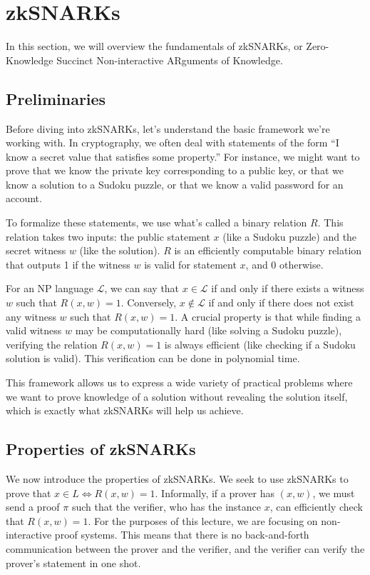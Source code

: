 \newcommand{\out}{\mathsf{out}}
\newcommand{\Assign}{:=}

\section{zkSNARKs}

In this section, we will overview the fundamentals of zkSNARKs, or Zero-Knowledge Succinct Non-interactive ARguments of Knowledge.

\subsection{Preliminaries}

Before diving into zkSNARKs, let's understand the basic framework we're working with. In cryptography, we often deal with statements of the form ``I know a secret value that satisfies some property.'' For instance, we might want to prove that we know the private key corresponding to a public key, or that we know a solution to a Sudoku puzzle, or that we know a valid password for an account.

To formalize these statements, we use what's called a binary relation $R$. This relation takes two inputs: the public statement $x$ (like a Sudoku puzzle) and the secret witness $w$ (like the solution). $R$ is an efficiently computable binary relation that outputs 1 if the witness $w$ is valid for statement $x$, and 0 otherwise.

For an NP language $\mathcal{L}$, we can say that $x \in \mathcal{L}$ if and only if there exists a witness $w$ such that $R(x, w) = 1$. Conversely, $x \notin \mathcal{L}$ if and only if there does not exist any witness $w$ such that $R(x, w) = 1$. A crucial property is that while finding a valid witness $w$ may be computationally hard (like solving a Sudoku puzzle), verifying the relation $R(x,w)=1$ is always efficient (like checking if a Sudoku solution is valid). This verification can be done in polynomial time.

This framework allows us to express a wide variety of practical problems where we want to prove knowledge of a solution without revealing the solution itself, which is exactly what zkSNARKs will help us achieve.

\subsection{Properties of zkSNARKs}

We now introduce the properties of zkSNARKs. We seek to use zkSNARKs to prove that $x \in L \iff R(x, w) = 1$. Informally, if a prover has $(x, w)$, we must send a proof $\pi$ such that the verifier, who has the instance $x$, can efficiently check that $R(x, w) = 1$. For the purposes of this lecture, we are focusing on non-interactive proof systems. This means that there is no back-and-forth communication between the prover and the verifier, and the verifier can verify the prover's statement in one shot.


